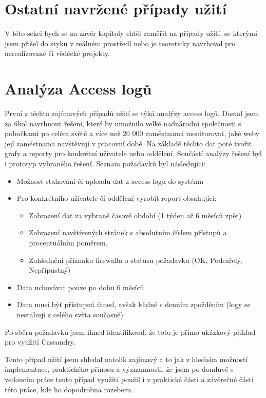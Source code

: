 \section{Ostatní navržené případy užití}

V této sekci bych se na závěr kapitoly chtěl zaměřit na případy užití, se kterými jsem přišel do styku v reálném prostředí nebo je teoreticky navrhoval pro nerealizované či věděcké projekty. 

\section{Analýza Access logů}
První z těchto zajímavých případů užití se týká analýzy access logů. Dostal jsem za úkol navrhnout řešení, které by umožnilo velké nadnárodní společnosti s pobočkami po celém světě a více než 20 000 zaměstnanci monitorovat, jaké weby její zaměstnanci navštěvují v pracovní době. Na základě těchto dat poté tvořit grafy a reporty pro konkrétní uživatele nebo oddělení. Součástí analýzy řešení byl i prototyp vybraného řešení. Seznam požadavků byl následující: 

\begin{itemize}
\item Možnost stahování či uploadu dat z access logů do systému
\item Pro konkrétního uživatele či oddělení vyrobit report obsahující:
\begin{itemize}
\item Zobrazení dat za vybrané časové období (1 týden až 6 měsíců zpět) 
\item Zobrazení navštívených stránek s absolutním číslem přístupů a procentuálním poměrem. 
\item Zohlednění příznaku firewallu o statusu požadavku (OK, Podezřelý, Nepřípustný)  
\end{itemize}
\item Data uchovávat pouze po dobu 6 měsíců 
\item Data musí být přístupná ihned, avšak klidně s denním zpožděním (logy se nestahují z celého světa současně)
\end{itemize}

Po sběru požadavků jsem ihned identifikoval, že toto je přímo ukázkový příklad pro využití Cassandry. 

Tento případ užití jsem shledal natolik zajímavý a to jak z hlediska možností implementace, praktického přínosu a významnosti, že jsem po domluvě s vedoucím práce tento případ využití použil i v praktické části a závěrečné části této práce, kde ho dopodrobna rozeberu.

